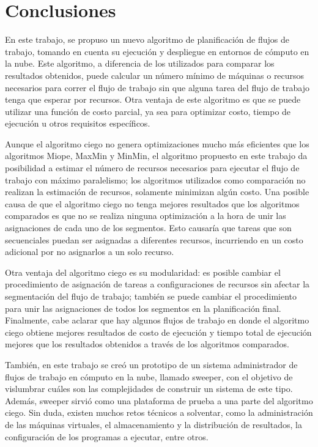 \chapter{Conclusiones}
\label{chap:conclusions}

En este trabajo, se propuso un nuevo algoritmo de planificación de flujos de trabajo, tomando en cuenta su ejecución y despliegue en entornos de cómputo en la nube. Este algoritmo, a diferencia de los utilizados para comparar los resultados obtenidos, puede calcular un número mínimo de máquinas o recursos necesarios para correr el flujo de trabajo sin que alguna tarea del flujo de trabajo tenga que esperar por recursos. Otra ventaja de este algoritmo es que se puede utilizar una funci\'on de costo parcial, ya sea para optimizar costo, tiempo de ejecuci\'on u otros requisitos espec\'ificos.

Aunque el algoritmo ciego no genera optimizaciones mucho más eficientes que los algoritmos Miope, MaxMin y MinMin, el algoritmo propuesto en este trabajo da posibilidad a estimar el número de recursos necesarios para ejecutar el flujo de trabajo con máximo paralelismo; los algoritmos utilizados como comparación no realizan la estimación de recursos, solamente minimizan algún costo. Una posible causa de que el algoritmo ciego no tenga mejores resultados que los algoritmos comparados es que no se realiza ninguna optimización a la hora de unir las asignaciones de cada uno de los segmentos. Esto causaría que tareas que son secuenciales puedan ser asignadas a diferentes recursos, incurriendo en un costo adicional por no asignarlos a un solo recurso.

Otra ventaja del algoritmo ciego es su modularidad: es posible cambiar el procedimiento de asignación de tareas a configuraciones de recursos sin afectar la segmentación del flujo de trabajo; también se puede cambiar el procedimiento para unir las asignaciones de todos los segmentos en la planificación final. Finalmente, cabe aclarar que hay algunos flujos de trabajo en donde el algoritmo ciego obtiene mejores resultados de costo de ejecución y tiempo total de ejecución mejores que los resultados obtenidos a través de los algoritmos comparados.

Tambi\'en, en este trabajo se cre\'o un prototipo de un sistema administrador de flujos de trabajo en cómputo en la nube, llamado sweeper, con el objetivo de vislumbrar cu\'ales son las complejidades de construir un sistema de este tipo. Además, sweeper sirvió como una plataforma de prueba a una parte del algoritmo ciego. Sin duda, existen muchos retos t\'ecnicos a solventar, como la administraci\'on de las m\'aquinas virtuales, el almacenamiento y la distribuci\'on de resultados, la configuraci\'on de los programas a ejecutar, entre otros.


